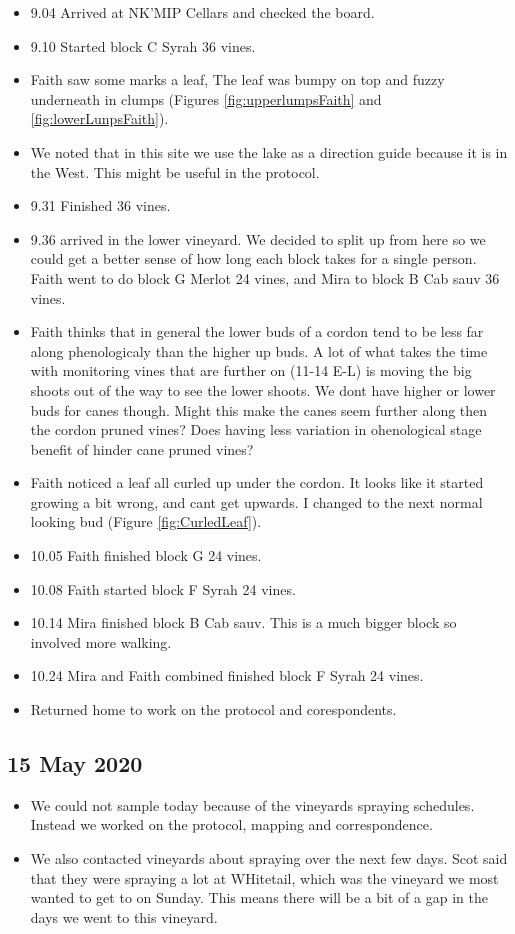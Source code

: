 \documentclass[11pt,letter]{article}
\newenvironment{smitemize}{
\begin{itemize}
  \setlength{\itemsep}{0pt}
  \setlength{\parskip}{0.8pt}
  \setlength{\parsep}{0pt}}
{\end{itemize}
}
\begin{document}
\begin{smitemize}
\item 9.04 Arrived at NK'MIP Cellars and checked the board. 
\item 9.10 Started block C Syrah 36 vines.
\item Faith saw some marks a leaf, The leaf was bumpy on top and fuzzy underneath in clumps (Figures \ref{fig:upperlumpsFaith} and \ref{fig:lowerLunpsFaith}).
\item We noted that in this site we use the lake as a direction guide because it is in the West. This might be useful in the protocol. 
\item 9.31 Finished 36 vines.  
\item 9.36 arrived in the lower vineyard. We decided to split up from here so we could get a better sense of how long each block takes for a single person. Faith went to do block G Merlot 24 vines, and Mira to block B Cab sauv 36 vines. 
\item Faith thinks that in general the lower buds of a cordon tend to be less far along phenologicaly than the higher up buds. A lot of what takes the time with monitoring vines that are further on (11-14 E-L) is moving the big shoots out of the way to see the lower shoots. We dont have higher or lower buds for canes though. Might this make the canes seem further along then the cordon pruned vines? Does having less variation in ohenological stage benefit of hinder cane pruned vines?
\item Faith noticed a leaf all curled up under the cordon. It looks like it started growing a bit wrong, and cant get upwards. I changed to the next normal looking bud (Figure \ref{fig:CurledLeaf}).
\item 10.05 Faith finished block G 24 vines.
\item 10.08 Faith started block F Syrah 24 vines.
\item 10.14 Mira finished block B Cab sauv. This is a much bigger block so involved more walking. 
\item 10.24 Mira and Faith combined finished block F Syrah 24 vines.
\item Returned home to work on the protocol and corespondents. 

\end{smitemize}

\subsection {15 May 2020}
\begin{smitemize}
\item We could not sample today because of the vineyards spraying schedules. Instead we worked on the protocol, mapping and correspondence.
\item We also contacted vineyards about spraying over the next few days. Scot said that they were spraying a lot at WHitetail, which was the vineyard we most wanted to get to on Sunday. This means there will be a bit of a gap in the days we went to this vineyard. 
\end{smitemize}
\end{document}
